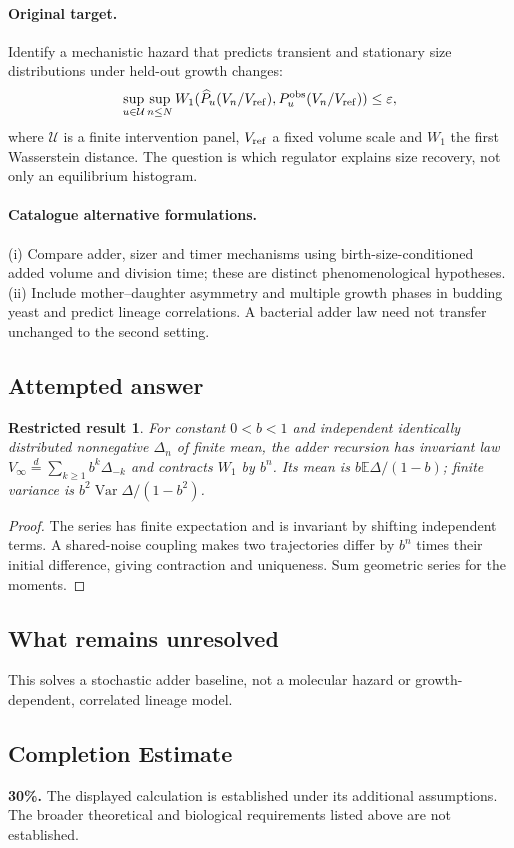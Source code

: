 \documentclass[11pt]{article}
\newcommand{\E}{\mathbb E}
\DeclareMathOperator{\Var}{Var}
\providecommand{\E}{\mathbb E}
\providecommand{\Var}{\operatorname{Var}}
\newtheorem{attemptresult}{Restricted result}[section]
\begin{document}
\paragraph{Original target.}
Identify a mechanistic hazard that predicts transient and stationary size distributions under held-out growth changes:
\[
\sup_{u\in\mathcal U}\sup_{n\leq N}
W_1(\widehat P_u(V_n/V_{\rm ref}),P_u^{\rm obs}(V_n/V_{\rm ref}))\leq\varepsilon,
\]
where $\mathcal U$ is a finite intervention panel, $V_{\rm ref}$ a fixed volume scale and $W_1$ the first Wasserstein distance. The question is which regulator explains size recovery, not only an equilibrium histogram.
\paragraph{Catalogue alternative formulations.}
(i) Compare adder, sizer and timer mechanisms using birth-size-conditioned added volume and division time; these are distinct phenomenological hypotheses. (ii) Include mother--daughter asymmetry and multiple growth phases in budding yeast and predict lineage correlations. A bacterial adder law need not transfer unchanged to the second setting.
\subsection{Attempted answer}
\begin{attemptresult}
For constant $0<b<1$ and independent identically distributed nonnegative $\Delta_n$ of finite mean, the adder recursion has invariant law $V_\infty\overset d=\sum_{k\geq1}b^k\Delta_{-k}$ and contracts $W_1$ by $b^n$. Its mean is $b\E\Delta/(1-b)$; finite variance is $b^2\Var\Delta/(1-b^2)$.
\end{attemptresult}
\begin{proof}
The series has finite expectation and is invariant by shifting independent terms. A shared-noise coupling makes two trajectories differ by $b^n$ times their initial difference, giving contraction and uniqueness. Sum geometric series for the moments.
\end{proof}
\subsection{What remains unresolved}
This solves a stochastic adder baseline, not a molecular hazard or growth-dependent, correlated lineage model.
\subsection{Completion Estimate}
\textbf{30\%.} The displayed calculation is established under its additional assumptions. The broader theoretical and biological requirements listed above are not established.
\end{document}
